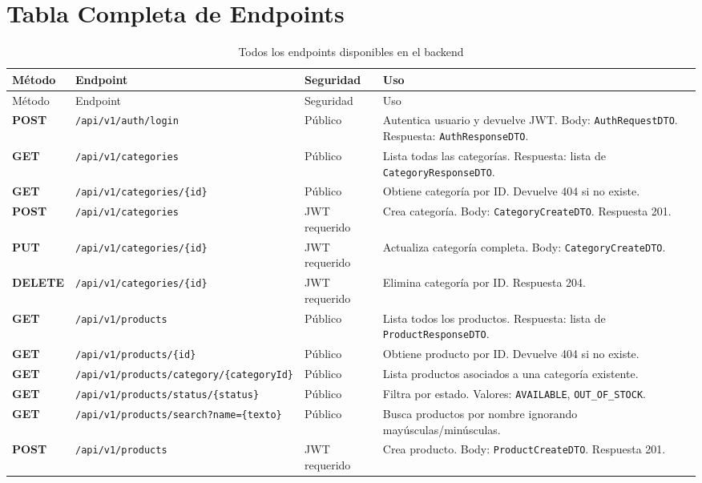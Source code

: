 \documentclass[11pt,oneside]{report}
\newcommand{\GET}{\textcolor{methodGet}{\textbf{GET}}}
\newcommand{\POST}{\textcolor{methodPost}{\textbf{POST}}}
\newcommand{\PUT}{\textcolor{methodPut}{\textbf{PUT}}}
\newcommand{\DELETE}{\textcolor{methodDelete}{\textbf{DELETE}}}
\newcommand{\pathcode}[1]{{\ttfamily\scriptsize\nolinkurl{#1}}}
\begin{document}
\section{Tabla Completa de Endpoints}

\begin{longtable}{p{1.6cm} p{5.2cm} p{2.6cm} p{5.9cm}}
\caption{Todos los endpoints disponibles en el backend}\\
\toprule
Método & Endpoint & Seguridad & Uso \\
\midrule
\endfirsthead
\toprule
Método & Endpoint & Seguridad & Uso \\
\midrule
\endhead
\POST & \pathcode{/api/v1/auth/login} & Público & Autentica usuario y devuelve JWT. Body: \texttt{AuthRequestDTO}. Respuesta: \texttt{AuthResponseDTO}.\\
\GET & \pathcode{/api/v1/categories} & Público & Lista todas las categorías. Respuesta: lista de \texttt{CategoryResponseDTO}.\\
\GET & \pathcode{/api/v1/categories/{id}} & Público & Obtiene categoría por ID. Devuelve 404 si no existe.\\
\POST & \pathcode{/api/v1/categories} & JWT requerido & Crea categoría. Body: \texttt{CategoryCreateDTO}. Respuesta 201.\\
\PUT & \pathcode{/api/v1/categories/{id}} & JWT requerido & Actualiza categoría completa. Body: \texttt{CategoryCreateDTO}.\\
\DELETE & \pathcode{/api/v1/categories/{id}} & JWT requerido & Elimina categoría por ID. Respuesta 204.\\
\GET & \pathcode{/api/v1/products} & Público & Lista todos los productos. Respuesta: lista de \texttt{ProductResponseDTO}.\\
\GET & \pathcode{/api/v1/products/{id}} & Público & Obtiene producto por ID. Devuelve 404 si no existe.\\
\GET & \pathcode{/api/v1/products/category/{categoryId}} & Público & Lista productos asociados a una categoría existente.\\
\GET & \pathcode{/api/v1/products/status/{status}} & Público & Filtra por estado. Valores: \texttt{AVAILABLE}, \texttt{OUT\_OF\_STOCK}.\\
\GET & \pathcode{/api/v1/products/search?name={texto}} & Público & Busca productos por nombre ignorando mayúsculas/minúsculas.\\
\POST & \pathcode{/api/v1/products} & JWT requerido & Crea producto. Body: \texttt{ProductCreateDTO}. Respuesta 201.\\

\end{longtable}
\end{document}
